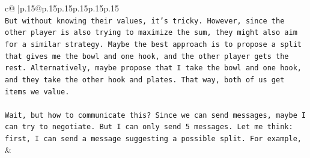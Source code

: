 \documentclass{article}
\begin{document}
{\begin{supertabular}{c@{$\;$}|p{.15\linewidth}@{}p{.15\linewidth}p{.15\linewidth}p{.15\linewidth}p{.15\linewidth}p{.15\linewidth}}
{{{\\ 
\texttt{But without knowing their values, it's tricky. However, since the other player is also trying to maximize the sum, they might also aim for a similar strategy. Maybe the best approach is to propose a split that gives me the bowl and one hook, and the other player gets the rest. Alternatively, maybe propose that I take the bowl and one hook, and they take the other hook and plates. That way, both of us get items we value.} \\
\\ 
\texttt{Wait, but how to communicate this? Since we can send messages, maybe I can try to negotiate. But I can only send 5 messages. Let me think: first, I can send a message suggesting a possible split. For example,} \\
            }
        }
    }
    & \\ \\


\end{supertabular}}
\end{document}
